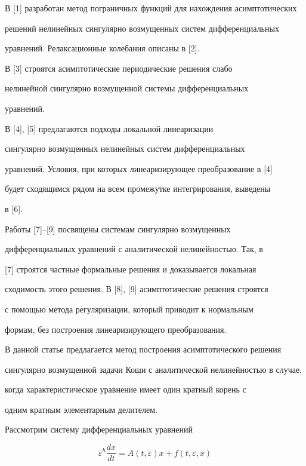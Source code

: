 В [1] разработан метод пограничных функций для  нахождения асимптотических


решений нелинейных сингулярно возмущенных систем дифференциальных


уравнений. Релаксационные колебания описаны в [2].


В [3] строятся асимптотические периодические решения слабо


нелинейной сингулярно возмущенной системы дифференциальных


уравнений.





В [4], [5] предлагаются подходы локальной линеаризации


сингулярно возмущенных нелинейных систем дифференциальных


уравнений. Условия, при которых линеаризирующее преобразование в [4]


будет сходящимся рядом на всем промежутке интегрирования, выведены


в [6].





Работы [7]--[9] посвящены системам сингулярно возмущенных


дифференциальных уравнений с аналитической нелинейностью. Так, в


[7] строятся частные формальные решения и доказывается локальная


сходимость этого решения. В [8], [9] асимптотические решения строятся


с помощью метода регуляризации, который приводит к нормальным


формам, без построения линеаризирующего преобразования.





В данной статье предлагается метод построения асимптотического решения 


сингулярно возмущенной задачи Коши с аналитической нелинейностью в случае,


когда характеристическое уравнение имеет один кратный корень с


одним кратным элементарным делителем.





Рассмотрим систему дифференциальных уравнений


\begin{equation}


\varepsilon^{h}\frac{dx}{dt}=A(t,\varepsilon)x+f(t,\varepsilon,x)


\end{equation}


